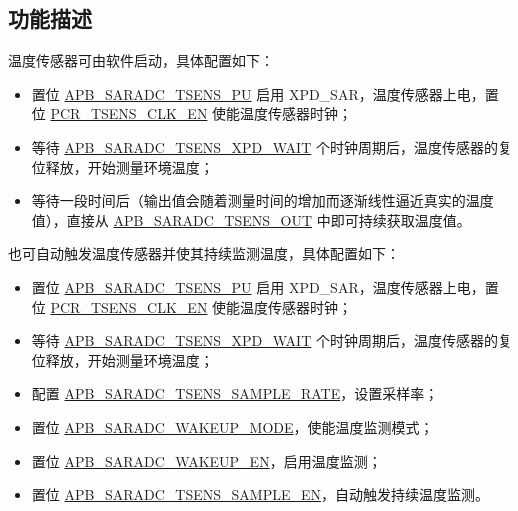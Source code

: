 \documentclass[main\_\_CN.tex]{subfiles}
\begin{document}
\subsection{功能描述}

温度传感器可由软件启动，具体配置如下：
    \begin{itemize}
        \item 置位 \hyperref[fielddesc:APBSARADCTSENSPU]{APB\_SARADC\_TSENS\_PU} 启用 XPD\_SAR，温度传感器上电，置位 \hyperref[fielddesc:PCRTSENSCLKEN]{PCR\_TSENS\_CLK\_EN} 使能温度传感器时钟；
        \item 等待 \hyperref[fielddesc:APBSARADCTSENSXPDWAIT]{APB\_SARADC\_TSENS\_XPD\_WAIT} 个时钟周期后，温度传感器的复位释放，开始测量环境温度；
        \item 等待一段时间后（输出值会随着测量时间的增加而逐渐线性逼近真实的温度值），直接从 \hyperref[fielddesc:APBSARADCTSENSOUT]{APB\_SARADC\_TSENS\_OUT} 中即可持续获取温度值。
    \end{itemize}

也可自动触发温度传感器并使其持续监测温度，具体配置如下：
    \begin{itemize}
        \item 置位 \hyperref[fielddesc:APBSARADCTSENSPU]{APB\_SARADC\_TSENS\_PU} 启用 XPD\_SAR，温度传感器上电，置位 \hyperref[fielddesc:PCRTSENSCLKEN]{PCR\_TSENS\_CLK\_EN} 使能温度传感器时钟；
        \item 等待 \hyperref[fielddesc:APBSARADCTSENSXPDWAIT]{APB\_SARADC\_TSENS\_XPD\_WAIT} 个时钟周期后，温度传感器的复位释放，开始测量环境温度；
        \item 配置 \hyperref[fielddesc:APBSARADCTSENSSAMPLERATE]{APB\_SARADC\_TSENS\_SAMPLE\_RATE}，设置采样率；
        \item 置位 \hyperref[fielddesc:APBSARADCWAKEUPMODE]{APB\_SARADC\_WAKEUP\_MODE}，使能温度监测模式；
        \item 置位 \hyperref[fielddesc:APBSARADCWAKEUPEN]{APB\_SARADC\_WAKEUP\_EN}，启用温度监测；
        \item 置位 \hyperref[fielddesc:APBSARADCTSENSSAMPLEEN]{APB\_SARADC\_TSENS\_SAMPLE\_EN}，自动触发持续温度监测。
    \end{itemize}
    
\end{document}
